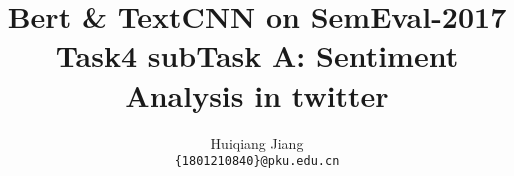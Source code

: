 \documentclass[11pt,a4paper]{article}
\title{Bert \& TextCNN on SemEval-2017 Task4 subTask A: Sentiment Analysis in twitter}
\author{Huiqiang Jiang \\
  {\tt \{1801210840\}@pku.edu.cn} \\}
\date{}
\begin{document}
\maketitle
\begin{abstract}
  
\end{abstract}











\end{document}
